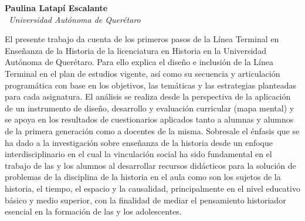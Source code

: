 \thispagestyle{empty}
{\par}
\setcounter{footnote}{0}

\bigskip
\begin{center}
{\bfseries Paulina Latapí Escalante}\\
{\itshape\ Universidad Autónoma de Querétaro\/}
\end{center}

\bigskip
{}


\noindent El presente trabajo da cuenta de los primeros pasos de la 
Línea Terminal en Enseñanza de la Historia de la licenciatura en 
Historia en la Universidad Autónoma de Querétaro. Para ello explica el 
diseño e inclusión  de la Línea Terminal en el plan de estudios 
vigente, así como su secuencia y articulación programática con base en 
los objetivos, las temáticas y las estrategias planteadas para cada 
asignatura. El análisis se realiza desde la perspectiva de la 
aplicación de un instrumento de diseño, desarrollo y evaluación 
curricular (mapa mental) y se apoya en los resultados de cuestionarios 
aplicados tanto a alumnas y alumnos de la primera generación como a 
docentes de la misma. Sobresale el énfasis que se ha dado a la 
investigación  sobre  enseñanza de la historia desde un enfoque 
interdisciplinario en el cual la vinculación social ha sido fundamental 
en el trabajo de las y los alumnos al desarrollar recursos didácticos 
para la solución de problemas de la disciplina de la historia en el 
aula como son los sujetos de la historia, el tiempo, el espacio  y la 
causalidad, principalmente en el nivel educativo básico y medio 
superior, con la finalidad de mediar el pensamiento historiador 
esencial en la formación de las y los adolescentes. 

\smallskip
{}

